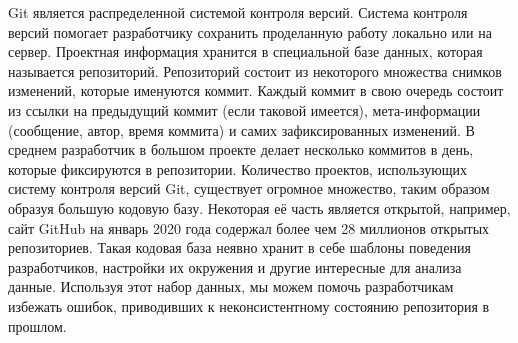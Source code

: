 Git является распределенной системой контроля версий. Система контроля версий помогает разработчику сохранить проделанную работу локально или на сервер. Проектная информация хранится в специальной базе данных, которая называется репозиторий. Репозиторий состоит из некоторого множества снимков изменений, которые именуются коммит. Каждый коммит в свою очередь состоит из ссылки на предыдущий коммит (если таковой имеется), мета-информации (сообщение, автор, время коммита) и самих зафиксированных изменений. В среднем разработчик в большом проекте делает несколько коммитов в день, которые фиксируются в репозитории. Количество проектов, использующих систему контроля версий Git, существует огромное множество, таким образом образуя большую кодовую базу. Некоторая её часть является открытой, например, сайт GitHub на январь 2020 года содержал более чем 28 миллионов открытых репозиториев. Такая кодовая база неявно хранит в себе шаблоны поведения разработчиков, настройки их окружения и другие интересные для анализа данные. Используя этот набор данных, мы можем помочь разработчикам избежать ошибок, приводивших к неконсистентному состоянию репозитория в прошлом.
